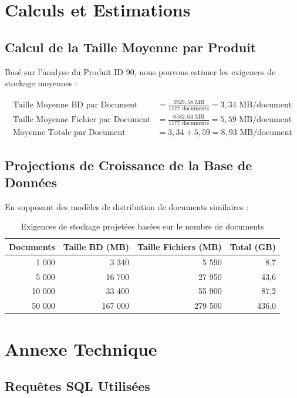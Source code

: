 \documentclass[12pt,a4paper]{article}
\begin{document}
\section{Calculs et Estimations}

\subsection{Calcul de la Taille Moyenne par Produit}

Basé sur l'analyse du Produit ID 90, nous pouvons estimer les exigences de stockage moyennes :

\begin{align}
\text{Taille Moyenne BD par Document} &= \frac{3 929,58 \text{ MB}}{1 177 \text{ documents}} = 3,34 \text{ MB/document}\\
\text{Taille Moyenne Fichier par Document} &= \frac{6 582,04 \text{ MB}}{1 177 \text{ documents}} = 5,59 \text{ MB/document}\\
\text{Moyenne Totale par Document} &= 3,34 + 5,59 = 8,93 \text{ MB/document}
\end{align}

\subsection{Projections de Croissance de la Base de Données}

En supposant des modèles de distribution de documents similaires :

\begin{table}[h]
\centering
\begin{tabular}{|r|r|r|r|}
\hline
\textbf{Documents} & \textbf{Taille BD (MB)} & \textbf{Taille Fichiers (MB)} & \textbf{Total (GB)} \\
\hline
1 000 & 3 340 & 5 590 & 8,7 \\
5 000 & 16 700 & 27 950 & 43,6 \\
10 000 & 33 400 & 55 900 & 87,2 \\
50 000 & 167 000 & 279 500 & 436,0 \\
\hline
\end{tabular}
\caption{Exigences de stockage projetées basées sur le nombre de documents}
\end{table}

\section{Annexe Technique}

\subsection{Requêtes SQL Utilisées}
\end{document}
